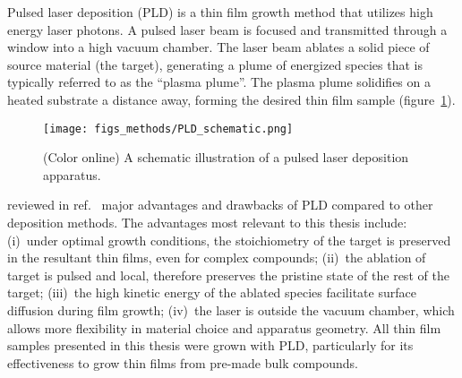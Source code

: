 Pulsed laser deposition (PLD) is a thin film growth method that utilizes high energy laser photons. A pulsed laser beam is focused and transmitted through a window into a high vacuum chamber. The laser beam ablates a solid piece of source material (the target), generating a plume of energized species that is typically referred to as the ``plasma plume''. The plasma plume solidifies on a heated substrate a distance away, forming the desired thin film sample (figure~\ref{fig:PLD_schematic}). %
\begin{figure}[ht]%
	\centering%
    \texttt{[image: figs\_methods/PLD\_schematic.png]}%
    \caption[Schematic Illustration of a PLD apparatus]{\label{fig:PLD_schematic}(Color online) A schematic illustration of a pulsed laser deposition apparatus.\footnotemark}%
\end{figure}%
%
%
\citeauthor{PLD_review} reviewed in ref.~\cite{PLD_review} major advantages and drawbacks of PLD compared to other deposition methods. The advantages most relevant to this thesis include: (i)~under optimal growth conditions, the stoichiometry of the target is preserved in the resultant thin films, even for complex compounds; (ii)~the ablation of target is pulsed and local, therefore preserves the pristine state of the rest of the target; (iii)~the high kinetic energy of the ablated species facilitate surface diffusion during film growth; (iv)~the laser is outside the vacuum chamber, which allows more flexibility in material choice and apparatus geometry. All thin film samples presented in this thesis were grown with PLD, particularly for its effectiveness to grow thin films from pre-made bulk compounds.

